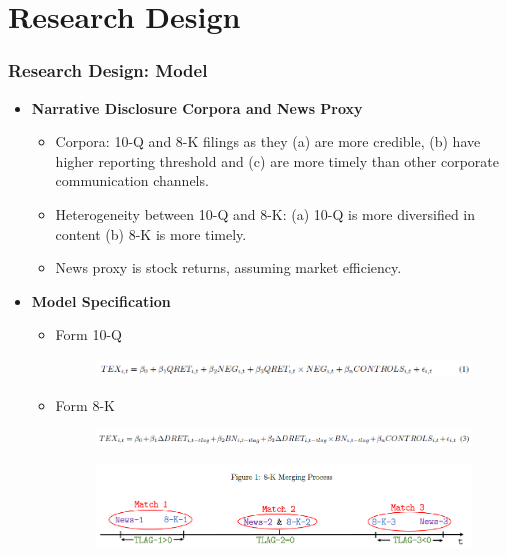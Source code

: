 \documentclass{beamer}
\begin{document}
\section{Research Design}
\begin{frame}
\frametitle{Research Design: Model}
\begin{itemize}

\item \textbf{Narrative Disclosure Corpora and News Proxy}

\begin{itemize}
	\item Corpora: 10-Q and 8-K filings as they (a) are more credible, (b) have higher reporting threshold and (c) are more timely than other corporate communication channels.
	\item Heterogeneity between 10-Q and 8-K: (a) 10-Q is more diversified in content (b) 8-K is more timely.
	\item News proxy is stock returns, assuming market efficiency.
\end{itemize}

\item \textbf{Model Specification}
	\begin{itemize}
		\item Form 10-Q
		
		\begin{figure}[h]
			\centering
			\includegraphics[width=0.75\linewidth]{eq1}
			\label{eq1}
		\end{figure}
	
		\item Form 8-K
		
		\begin{figure}[h]
			\centering
			\includegraphics[width=0.8\linewidth]{eq3}
			\label{eq3}
		\end{figure}
	
		\begin{figure}[h]
			\centering
			\includegraphics[width=0.6\linewidth]{fig1}
			\label{fig1}
		\end{figure}
	\end{itemize}

\end{itemize}
\end{frame}
\end{document}
